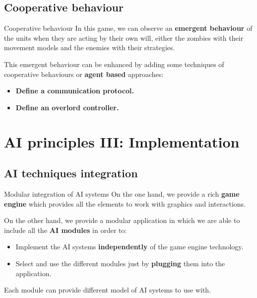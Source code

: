 \documentclass[10pt]{beamer}
\begin{document}
	    \subsection{Cooperative behaviour}

	    \begin{frame}{Cooperative behaviour}
	     In this game, we can observe an \textbf{emergent behaviour} of the units when they are acting by their own will, either the zombies with their movement models and the enemies with their strategies.
	      \newline

	     This emergent behaviour can be enhanced by adding some techniques of cooperative behaviours or \textbf{agent based} approaches:\newline


	      \begin{itemize}
		\small
		\item \textbf{Define a communication protocol.}
		\item \textbf{Define an overlord controller.}
	      \end{itemize}
	    \end{frame}


	\section{AI principles III: Implementation}

	  \subsection{AI techniques integration}

	    \begin{frame}{Modular integration of AI systems}
	      On the one hand, we provide a rich \textbf{game engine} which provides all the elements to work with graphics and interactions. \newline
  
	      On the other hand, we provide a modular application in which we are able to include all the \textbf{AI modules} in order to:\newline

	      \begin{itemize}
	       \item Implement the AI systems \textbf{independently} of the game engine technology.
	       \item Select and use the different modules just by \textbf{plugging} them into the application.\newline
	      \end{itemize}

	      Each module can provide different model of AI systems to use with.

	    \end{frame}
\end{document}
